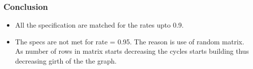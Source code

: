 \documentclass[xcolor=dvipsname]
{beamer}
\begin{document}
\begin{frame}[t] 
\frametitle{ Conclusion }
\begin{itemize}
\item All the specification are matched for the rates upto 0.9.
\item The specs are not met for rate = 0.95. The reason is use of random matrix. As number of rows in matrix
starts decreasing the cycles starts building thus decreasing girth of the the graph. 
\end{itemize}


\end{frame}
\end{document}
